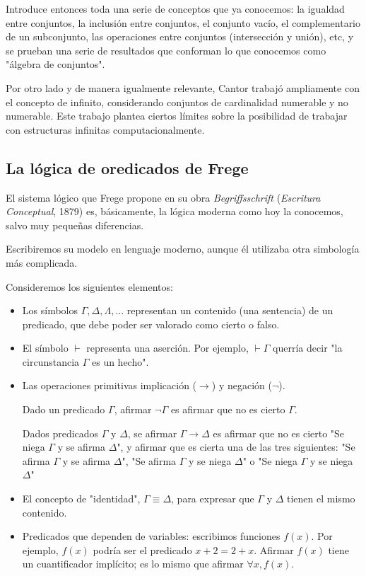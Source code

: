 \documentclass{article}
\begin{document}
Introduce entonces toda una serie de conceptos que ya conocemos: la igualdad entre conjuntos, la inclusión entre conjuntos, el conjunto vacío, el complementario de un subconjunto, las operaciones entre conjuntos (intersección y unión), etc, y se prueban una serie de resultados que conforman lo que conocemos como "álgebra de conjuntos".

Por otro lado y de manera igualmente relevante, Cantor trabajó ampliamente con el concepto de infinito, considerando conjuntos de cardinalidad numerable y no numerable. Este trabajo plantea ciertos límites sobre la posibilidad de trabajar con estructuras infinitas computacionalmente\cite{stoll1979set}.

\subsection{La lógica de oredicados de Frege}

El sistema lógico que Frege propone en su obra \textit{Begriffsschrift} (\textit{Escritura Conceptual}, 1879) es, básicamente, la lógica moderna como hoy la conocemos, salvo muy pequeñas diferencias.

Escribiremos su modelo en lenguaje moderno, aunque él utilizaba otra simbología más complicada.

Consideremos los siguientes elementos:

\begin{itemize}
    \item Los símbolos $\Gamma, \Delta, \Lambda, ...$ representan un contenido (una sentencia) de un predicado, que debe poder ser valorado como cierto o falso. 
    \item El símbolo $\vdash$ representa una aserción. Por ejemplo, $\vdash \Gamma$ querría decir "la circunstancia $\Gamma$ es un hecho".
    \item Las operaciones primitivas implicación ($\rightarrow$) y negación ($\lnot$).
    
    Dado un predicado $\Gamma$, afirmar $\lnot \Gamma$ es afirmar que no es cierto $\Gamma$.
    
    Dados predicados $\Gamma$ y $\Delta$, se afirmar $\Gamma \rightarrow \Delta$ es afirmar que no es cierto "Se niega $\Gamma$ y se afirma $\Delta$", y afirmar que es cierta una de las tres siguientes: "Se afirma $\Gamma$ y se afirma $\Delta$", "Se afirma $\Gamma$ y se niega $\Delta$" o "Se niega $\Gamma$ y se niega $\Delta$"

    \item El concepto de "identidad", $\Gamma \equiv \Delta$, para expresar que $\Gamma$ y $\Delta$ tienen el mismo contenido.
    \item Predicados que dependen de variables: escribimos funciones $f(x)$. Por ejemplo, $f(x)$ podría ser el predicado $x + 2 = 2 + x$. Afirmar $f(x)$ tiene un cuantificador implícito; es lo mismo que afirmar $\forall x, f(x)$.
\end{itemize}
\end{document}
